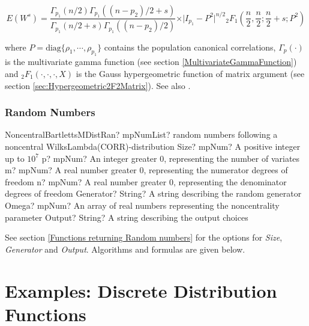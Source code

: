 \begin{equation}
	E(W^s) = \frac{\Gamma_{p_1}(n/2)\Gamma_{p_1}((n - p_2)/2 + s)}{\Gamma_{p_1}(n/2+s)\Gamma_{p_1}((n-p_2)/2)} \times \vert I_{p_1}-P^2 \vert ^{n/2}  {}_2F_1\left(\frac{n}{2},\frac{n}{2} ;\frac{n}{2}+ s ; P^2\right)
\end{equation}

where $P = \text{diag} \{\rho_1, \cdots , \rho_{p_1} \}$ contains the population canonical correlations, $\Gamma_p(\cdot)$ is the multivariate gamma function (see section \ref{MultivariateGammaFunction}) and ${}_2F_1(\cdot,\cdot,\cdot,X)$ is the Gauss hypergeometric function of matrix argument (see section \ref{sec:Hypergeometric2F2Matrix}). See also \cite{Butler_Wood_2002}.





\subsection{Random Numbers}
\begin{mpFunctionsExtract}
	\mpFunctionSevenNotImplemented
	{NoncentralBartlettsMDistRan? mpNumList? random numbers following a noncentral WilksLambda(CORR)-distribution}
	{Size? mpNum? A positive integer up to $10^7$}
	{p? mpNum? An integer greater 0, representing the number of variates}
	{m? mpNum? A real number greater 0, representing the numerator  degrees of freedom}
	{n? mpNum? A real number greater 0, representing the denominator degrees of freedom}
	{Generator? String? A string describing the random generator}
	{Omega? mpNum? An array of real numbers representing the noncentrality parameter}
	{Output? String? A string describing the output choices}
\end{mpFunctionsExtract}

\vspace{0.3cm}

See section \ref{Functions returning Random numbers} for the options for  {\itshape\sffamily Size},  {\itshape\sffamily Generator} and {\itshape\sffamily Output}. Algorithms and formulas are given below.






\chapter{Examples: Discrete Distribution Functions}

%
%
%
%
%
%

